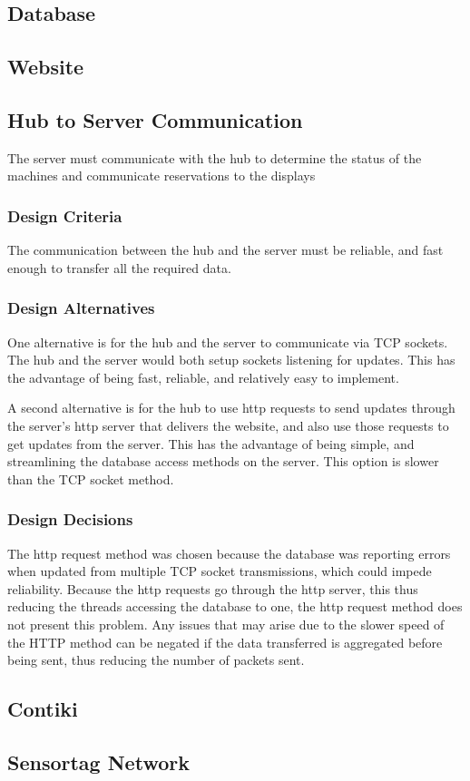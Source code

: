 \documentclass[PPFS.tex]{template/subfiles}
\begin{document}
\subsection{Database}

\subsection{Website}

\subsection{Hub to Server Communication}
The server must communicate with the hub to determine the status of the machines and communicate reservations to the displays

\subsubsection{Design Criteria}
The communication between the hub and the server must be reliable, and fast enough to transfer all the required data.

\subsubsection{Design Alternatives}
One alternative is for the hub and the server to communicate via TCP sockets. The hub and the server would both setup sockets listening for updates. This has the advantage of being fast, reliable, and relatively easy to implement.

A second alternative is for the hub to use http requests to send updates through the server's http server that delivers the website, and also use those requests to get updates from the server. This has the advantage of being simple, and streamlining the database access methods on the server. This option is slower than the TCP socket method.

\subsubsection{Design Decisions}
The http request method was chosen because the database was reporting errors when updated from multiple TCP socket transmissions, which could impede reliability. Because the http requests go through the http server, this thus reducing the threads accessing the database to one, the http request method does not present this problem. Any issues that may arise due to the slower speed of the HTTP method can be negated if the data transferred is aggregated before being sent, thus reducing the number of packets sent.


\subsection{Contiki}

\subsection{Sensortag Network}
\end{document}
